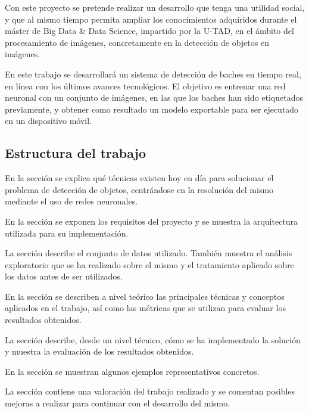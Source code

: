 Con este proyecto se pretende realizar un desarrollo que tenga una utilidad social, y que al mismo tiempo permita ampliar los conocimientos adquiridos durante el máster de Big Data \& Data Science, impartido por la U-TAD, en el ámbito del procesamiento de imágenes, concretamente en la detección de objetos en imágenes.

En este trabajo se desarrollará un sistema de detección de baches en tiempo real, en línea con los últimos avances tecnológicos. El objetivo es entrenar una red neuronal con un conjunto de imágenes, en las que los baches han sido etiquetados previamente, y obtener como resultado un modelo exportable para ser ejecutado en un dispositivo móvil.


\subsection{Estructura del trabajo}

En la sección \textit{} se explica qué técnicas existen hoy en día para solucionar el problema de detección de objetos, centrándose en la resolución del mismo mediante el uso de redes neuronales.

En la sección \textit{} se exponen los requisitos del proyecto y se muestra la arquitectura utilizada para su implementación.

La sección \textit{} describe el conjunto de datos utilizado. También muestra el análisis exploratorio que se ha realizado sobre el mismo y el tratamiento aplicado sobre los datos antes de ser utilizados.

En la sección \textit{} se describen a nivel teórico las principales técnicas y conceptos aplicados en el trabajo, así como las métricas que se utilizan para evaluar los resultados obtenidos.

La sección \textit{} describe, desde un nivel técnico, cómo se ha implementado la solución y muestra la evaluación de los resultados obtenidos.

En la sección \textit{} se muestran algunos ejemplos representativos concretos.

La sección \textit{} contiene una valoración del trabajo realizado y se comentan posibles mejoras a realizar para continuar con el desarrollo del mismo.